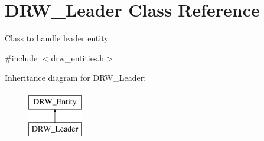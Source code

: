 \hypertarget{class_d_r_w___leader}{}\section{D\+R\+W\+\_\+\+Leader Class Reference}
\label{class_d_r_w___leader}


Class to handle leader entity.  




{\ttfamily \#include $<$drw\+\_\+entities.\+h$>$}

Inheritance diagram for D\+R\+W\+\_\+\+Leader\+:\begin{figure}[H]
\begin{center}
\leavevmode
\includegraphics[height=2.000000cm]{d4/dfd/class_d_r_w___leader}
\end{center}
\end{figure}
